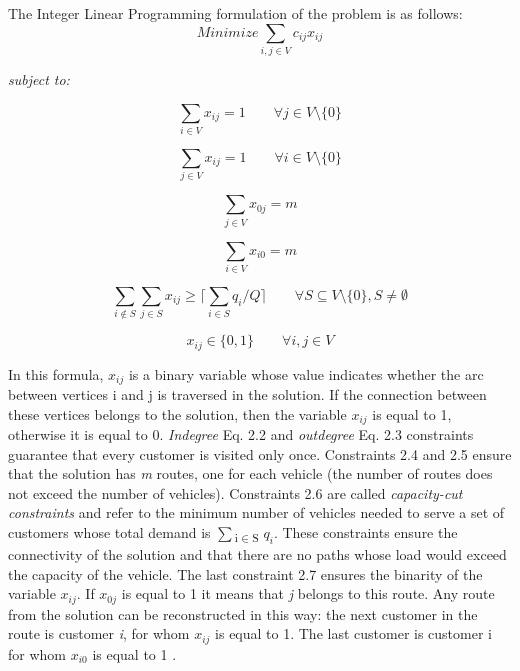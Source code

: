 \documentclass[a4paper,twoside,12pt]{book}
\begin{document}
The Integer Linear Programming formulation of the problem is as follows:\cite{bib:book:TothAndVigo}
\begin{equation}
Minimize \sum_{i,j \in V} c_{ij}x_{ij}
\end{equation}

\textit{subject to:}

\begin{equation}
\sum_{i \in V}x_{ij} = 1 \qquad \forall j \in V \setminus \lbrace 0 \rbrace
\end{equation}

\begin{equation}
\sum_{j \in V}x_{ij} = 1 \qquad \forall i \in V \setminus \lbrace 0 \rbrace
\end{equation}

\begin{equation}
\sum_{j \in V}x_{0j} = m 
\end{equation}

\begin{equation}
\sum_{i \in V}x_{i0} = m 
\end{equation}

\begin{equation}
\sum_{i \not\in S} \sum_{j \in S}x_{ij} \geq \lceil \sum_{i \in S} q_{i} / Q \rceil \qquad \forall S \subseteq V \setminus \lbrace 0 \rbrace , S \neq \emptyset
\end{equation}

\begin{equation}
x_{ij} \in \lbrace 0,1 \rbrace \qquad \forall i,j \in V
\end{equation}

In this formula, $x_{ij}$  is a binary variable whose value indicates whether the arc between vertices i and j is traversed in the solution.  
If the connection between these vertices belongs to the solution, then the variable $x_{ij}$ is equal to 1, otherwise it is equal to 0. \textit{Indegree} Eq. 2.2 and \textit{outdegree} Eq. 2.3 constraints guarantee that every customer is visited only once. Constraints 2.4 and 2.5 ensure that the solution has \textit{m} routes, one for each vehicle (the number of routes does not exceed the number of vehicles).
Constraints 2.6 are called \textit{capacity-cut constraints} and refer to the minimum number of vehicles needed to serve a set of customers whose total demand is $\sum$\textsubscript{i$\in$S} $q_{i}$. These constraints ensure the connectivity of the solution and that there are no paths whose load would exceed the capacity of the vehicle. The last constraint 2.7 ensures the binarity of the variable $x_{ij}$. If $x_{0j}$ is equal to 1 it means that \textit{j} belongs to this route. Any route from the solution can be reconstructed in this way: the next customer in the route is customer \textit{i}, for whom $x_{ij}$ is equal to 1. The last customer is customer i for whom $x_{i0}$ is equal to 1 \cite{bib:book:TothAndVigo}.
\end{document}
